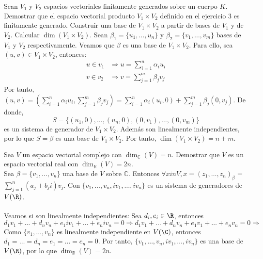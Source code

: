 \begin{ejercicio} Sean \( V_1 \) y \( V_2 \) espacios vectoriales finitamente generados sobre un cuerpo \( K \). Demostrar que el espacio vectorial producto \( V_1 \times V_2 \) definido en el ejercicio 3 es finitamente generado. Construir una base de \( V_1 \times V_2 \) a partir de bases de \( V_1 \) y de \( V_2 \). Calcular \( \dim(V_1 \times V_2) \).
	Sean $\beta_1 = \{ u_1, \ldots, u_n \}$ y $\beta_2 = \{ v_1, \ldots, v_m \}$ bases de $V_1$ y $V_2$ respectivamente.
	Veamos que $\beta$ es una base de $V_1 \times V_2$. Para ello, sea $(u,v) \in V_1 \times V_2$, entonces:
	\begin{align*}
		u \in v_1 & \Rightarrow u = \sum_{i=1}^{n} \alpha_i u_i \\
		v \in v_2 & \Rightarrow v = \sum_{j=1}^{m} \beta_j v_j
	\end{align*}
	Por tanto, $(u,v) = (\sum_{i=1}^{n} \alpha_i u_i, \sum_{j=1}^{m} \beta_j v_j) = \sum_{i=1}^{n} \alpha_i (u_i,0) + \sum_{j=1}^{m} \beta_j (0,v_j)$. De donde,
	\begin{equation*}
		S = \{ (u_1,0), \ldots, (u_n,0), (0,v_1), \ldots, (0,v_m) \}
	\end{equation*}
	es un sistema de generador de $V_1 \times V_2$. Además son linealmente independientes, por lo que $S = \beta$ es una base de $V_1 \times V_2$. Por tanto, $\dim(V_1 \times V_2) = n+m$.
\end{ejercicio}



\begin{ejercicio} Sea \( V \) un espacio vectorial complejo con \( \dim_{\mathbb{C}}(V) = n \). Demostrar que \( V \) es un espacio vectorial real con \( \dim_{\mathbb{R}}(V) = 2n \).\\
	Sea $\beta = \{ v_1, \ldots, v_n \}$ una base de $V$ sobre $\mathbb{C}$. Entonces $\forall x in V, x = (z_1, \ldots, z_n)_{\beta}$
	= $\sum_{j=1}^{n} (a_j + b_j i) v_j$. Con $\{ v_1, \ldots, v_n, i v_1, \ldots, i v_n \}$ es un sistema de generadores de $V(\R)$.
	\\ \\Veamos si son linealmente independientes:
	Sea $d_i, e_i \in \R$, entonces $d_1 v_1 + \ldots + d_n v_n + e_1 i v_1 + \ldots + e_n i v_n = 0 \Rightarrow
		d_1 v_1 + \ldots + d_n v_n + e_1 v_1 + \ldots + e_n v_n = 0 \Rightarrow
	$ Como $\{v_1, \ldots, v_n\}$ es linealmente independiente en $V(\C)$, entonces $d_1 = \ldots = d_n = e_1 = \ldots = e_n = 0$.
	Por tanto, $\{ v_1, \ldots, v_n, i v_1, \ldots, i v_n \}$ es una base de $V(\R)$, por lo que $\dim_{\mathbb{R}}(V) = 2n$.
\end{ejercicio}



